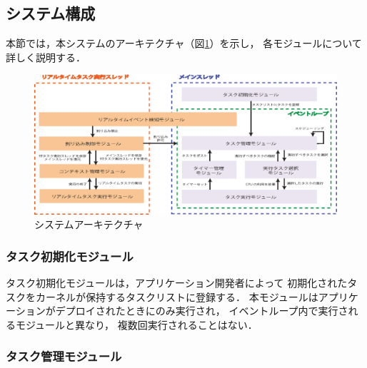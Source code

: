 \subsection{システム構成}
本節では，本システムのアーキテクチャ（図\ref{fig:system_architecture}）を示し，
各モジュールについて詳しく説明する．


\begin{figure}[htbp]
 \begin{center}
  \includegraphics[width=150mm]{./images/system_architecture.eps}
 \end{center}
 \caption{システムアーキテクチャ}
 \label{fig:system_architecture}
\end{figure}


\subsubsection{タスク初期化モジュール}

\vspace{0.5em}タスク初期化モジュールは，アプリケーション開発者によって
初期化されたタスクをカーネルが保持するタスクリストに登録する．
本モジュールはアプリケーションがデプロイされたときにのみ実行され，
イベントループ内で実行されるモジュールと異なり，
複数回実行されることはない．



\subsubsection{タスク管理モジュール}


